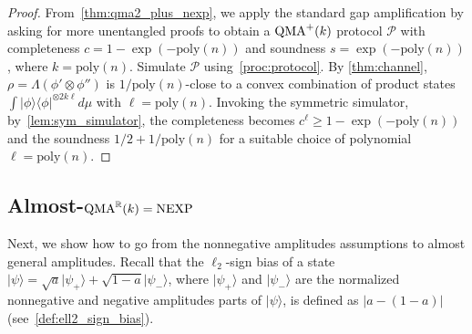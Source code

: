 \documentclass[10pt,a4paper]{article}
\theoremstyle{remark}
\def\cal{\mathcal}
\newcommand{\R}{{\mathbb R}}
\newcommand{\abs}[1]{\ensuremath{\left\lvert #1 \right\rvert}}
\newcommand{\calP}{{\cal P}}
\newcommand{\poly}{{\mathrm{poly}}}
\newcommand{\1}[1]{\mathds{1}{[#1]}}
\newcommand{\ket}[1]{\lvert #1\rangle}
\newcommand{\QMA}{\textup{QMA}}
\newcommand{\NEXP}{\textup{NEXP}}
\newcommand{\bra}[1]{\langle#1|}
\numberwithin{equation}{section}
\begin{document}
\TheoQMAThree*

\begin{proof}
  From~\cref{thm:qma2_plus_nexp}, we apply the standard gap amplification by asking for more unentangled proofs to obtain a $\QMA^+(k)$ protocol $\calP$ with completeness $c = 1-\exp(-\poly(n))$
  and soundness $s=\exp(-\poly(n))$, where $k=\poly(n)$. Simulate $\calP$ using~\cref{proc:protocol}.
  By \cref{thm:channel}, $\rho = \Lambda(\phi'\otimes \phi'')$ is $1/\poly(n)$-close to a convex combination of
  product states $\int \ket{\phi} \bra{\phi}^{\otimes 2k\ell} d\mu$ with $\ell = \poly(n)$. Invoking the symmetric simulator, by~\cref{lem:sym_simulator},
  the completeness becomes $c^\ell \ge 1-\exp(-\poly(n))$ and the soundness $1/2+1/\poly(n)$ for a suitable choice of polynomial $\ell=\poly(n)$.
\end{proof}



\subsection{Almost-$\QMA^\R(k) = \NEXP$}
Next, we show how to go from the nonnegative amplitudes assumptions to almost general amplitudes.
Recall that the $\ell_2$-sign bias of a state $\ket{\psi} = \sqrt{a} \ket{\psi_+} + \sqrt{1-a}\ket{\psi_{-}}$,
where $\ket{\psi_+}$ and $\ket{\psi_{-}}$ are the normalized nonnegative and negative amplitudes parts of $\ket{\psi}$,
is defined as $\abs{a-(1-a)}$ (see~\cref{def:ell2_sign_bias}). 

\TheoAlmostGenAmp*
\end{document}
